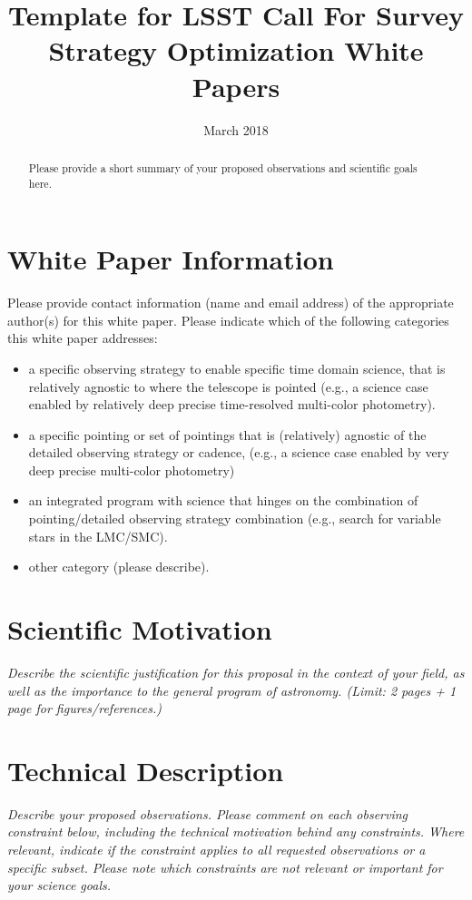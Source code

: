 \documentclass[11pt]{article}
\title{Template for LSST Call For Survey Strategy Optimization White Papers}
\author{}
\date{March 2018}
\begin{document}
\maketitle

\begin{abstract}
Please provide a short summary of your proposed observations and scientific goals here.
\end{abstract}

\section{White Paper Information}
Please provide contact information (name and email address) of the appropriate author(s) for this white paper.
Please indicate which of the following categories this white paper addresses:
\begin{itemize} 
\item a specific observing strategy to enable specific time domain science, 
	that is relatively agnostic to where the telescope is pointed (e.g., a science case enabled 
	by relatively deep precise time-resolved multi-color photometry). 
\item a specific pointing or set of pointings that is (relatively) agnostic of the detailed observing 
	strategy or cadence, (e.g., a science case enabled by very deep precise multi-color 
	photometry)
\item an integrated program with science that hinges on the combination of pointing/detailed 
	observing strategy combination (e.g., search for variable stars in the 
	LMC/SMC). 
\item other category (please describe).
\end{itemize}  


\clearpage

\section{Scientific Motivation}

\begin{footnotesize}
{\it Describe the scientific justification for this proposal in the context
of your field, as well as the importance to the general program of astronomy. 
(Limit: 2 pages + 1 page for figures/references.)}
\end{footnotesize}

\vspace{.6in}

\section{Technical Description}
\begin{footnotesize}
{\it Describe your proposed observations. Please comment on each observing constraint
below, including the technical motivation behind any constraints. Where relevant, indicate
if the constraint applies to all requested observations or a specific subset. Please note which 
constraints are not relevant or important for your science goals.}
\end{footnotesize}
\end{document}
